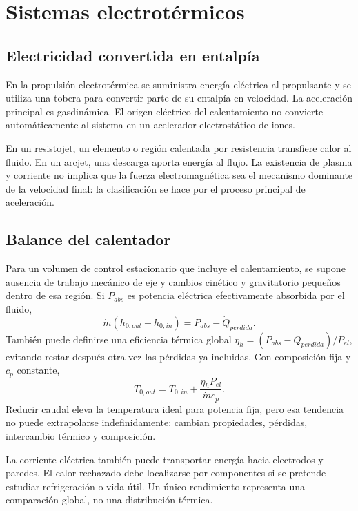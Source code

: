 \chapter{Sistemas electrotérmicos}\label{ch:22}
\section{Electricidad convertida en entalpía}
En la propulsión electrotérmica se suministra energía eléctrica al propulsante y se utiliza una tobera para convertir parte de su entalpía en velocidad. La aceleración principal es gasdinámica. El origen eléctrico del calentamiento no convierte automáticamente al sistema en un acelerador electrostático de iones.

En un resistojet, un elemento o región calentada por resistencia transfiere calor al fluido. En un arcjet, una descarga aporta energía al flujo. La existencia de plasma y corriente no implica que la fuerza electromagnética sea el mecanismo dominante de la velocidad final: la clasificación se hace por el proceso principal de aceleración.\cite{JPL-EP}
\section{Balance del calentador}
Para un volumen de control estacionario que incluye el calentamiento, se supone ausencia de trabajo mecánico de eje y cambios cinético y gravitatorio pequeños dentro de esa región. Si $P_{abs}$ es potencia eléctrica efectivamente absorbida por el fluido,
\[
 \dot m(h_{0,out}-h_{0,in})=P_{abs}-\dot Q_{perdida}.
\]
También puede definirse una eficiencia térmica global $\eta_h=(P_{abs}-\dot Q_{perdida})/P_{el}$, evitando restar después otra vez las pérdidas ya incluidas. Con composición fija y $c_p$ constante,
\begin{equation}
 T_{0,out}=T_{0,in}+\frac{\eta_hP_{el}}{\dot m c_p}.
\end{equation}
Reducir caudal eleva la temperatura ideal para potencia fija, pero esa tendencia no puede extrapolarse indefinidamente: cambian propiedades, pérdidas, intercambio térmico y composición.

La corriente eléctrica también puede transportar energía hacia electrodos y paredes. El calor rechazado debe localizarse por componentes si se pretende estudiar refrigeración o vida útil. Un único rendimiento representa una comparación global, no una distribución térmica.
